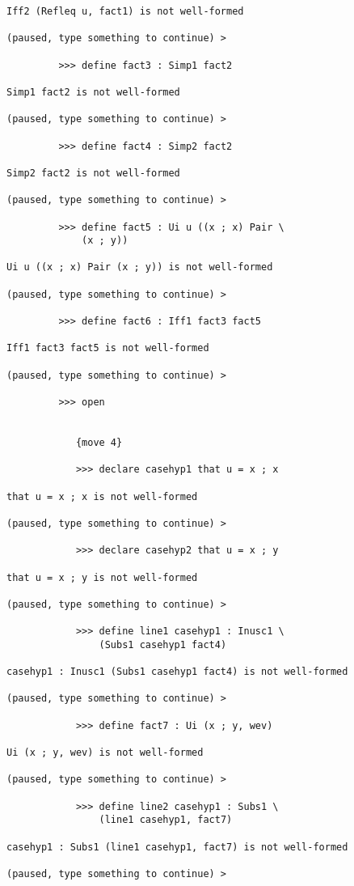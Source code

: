\documentclass[12pt]{article}
\begin{document}
\begin{verbatim}
Iff2 (Refleq u, fact1) is not well-formed

(paused, type something to continue) >

         >>> define fact3 : Simp1 fact2

Simp1 fact2 is not well-formed

(paused, type something to continue) >

         >>> define fact4 : Simp2 fact2

Simp2 fact2 is not well-formed

(paused, type something to continue) >

         >>> define fact5 : Ui u ((x ; x) Pair \
             (x ; y))

Ui u ((x ; x) Pair (x ; y)) is not well-formed

(paused, type something to continue) >

         >>> define fact6 : Iff1 fact3 fact5

Iff1 fact3 fact5 is not well-formed

(paused, type something to continue) >

         >>> open


            {move 4}

            >>> declare casehyp1 that u = x ; x

that u = x ; x is not well-formed

(paused, type something to continue) >

            >>> declare casehyp2 that u = x ; y

that u = x ; y is not well-formed

(paused, type something to continue) >

            >>> define line1 casehyp1 : Inusc1 \
                (Subs1 casehyp1 fact4)

casehyp1 : Inusc1 (Subs1 casehyp1 fact4) is not well-formed

(paused, type something to continue) >

            >>> define fact7 : Ui (x ; y, wev)

Ui (x ; y, wev) is not well-formed

(paused, type something to continue) >

            >>> define line2 casehyp1 : Subs1 \
                (line1 casehyp1, fact7)

casehyp1 : Subs1 (line1 casehyp1, fact7) is not well-formed

(paused, type something to continue) >


\end{verbatim}
\end{document}
